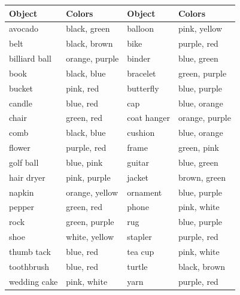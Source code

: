 \documentclass[11pt]{article}
\begin{document}
\begin{tabular}{l l l l}
\toprule
Object & Colors & Object & Colors \\
\midrule
avocado & black, green & balloon & pink, yellow \\
belt & black, brown & bike & purple, red\\
billiard ball & orange, purple & binder & blue, green \\
book & black, blue & bracelet & green, purple \\
bucket & pink, red & butterfly & blue, purple\\
candle & blue, red & cap & blue, orange \\
chair & green, red & coat hanger & orange, purple \\
comb & black, blue & cushion & blue, orange\\
flower & purple, red & frame & green, pink \\
golf ball & blue, pink & guitar & blue, green\\
hair dryer & pink, purple & jacket & brown, green\\
napkin & orange, yellow & ornament & blue, purple\\
pepper & green, red & phone & pink, white\\
rock & green, purple & rug & blue, purple \\
shoe & white, yellow & stapler & purple, red\\
thumb tack & blue, red & tea cup & pink, white \\
toothbrush & blue, red & turtle & black, brown \\
wedding cake & pink, white & yarn & purple, red\\
\bottomrule
\end{tabular}
\end{document}
